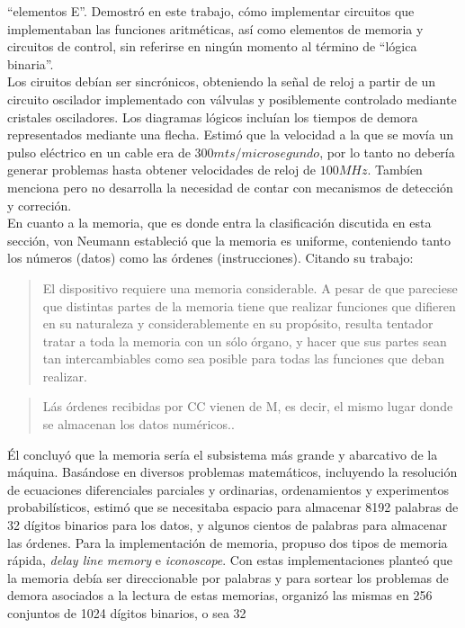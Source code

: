 ``elementos E''. Demostró en este trabajo, cómo implementar circuitos que
implementaban las funciones aritméticas, así como elementos de memoria y
circuitos de control, sin referirse en ningún momento al término de ``lógica
binaria''.\\
Los ciruitos debían ser sincrónicos, obteniendo la señal de reloj a partir de un
circuito oscilador implementado con válvulas y posiblemente controlado mediante
cristales osciladores. Los diagramas lógicos incluían los tiempos de demora
representados mediante una flecha. Estimó que la velocidad a la que se movía un
pulso eléctrico en un cable era de $300 mts/microsegundo$, por lo tanto no
debería generar problemas hasta obtener velocidades de reloj de $100MHz$.
Tambíen menciona pero no desarrolla la necesidad de contar con mecanismos de
detección y correción.\\
En cuanto a la memoria, que es donde entra la clasificación discutida en esta
sección, von Neumann estableció que la memoria es uniforme, conteniendo tanto
los números (datos) como las órdenes (instrucciones). Citando su trabajo:
\begin{quote}
  El dispositivo requiere una memoria considerable. A pesar de que pareciese 
  que distintas partes de la memoria tiene que realizar funciones que difieren 
  en su naturaleza y considerablemente en su propósito, resulta tentador tratar 
  a toda la memoria con un sólo órgano, y hacer que sus partes sean tan 
  intercambiables como sea posible para todas las funciones que deban realizar. 
  \cite[sección, 2.5]{vonNeumann}
\end{quote}
\begin{quote}
  Lás órdenes recibidas por CC vienen de M, es decir, el mismo lugar donde se
  almacenan los datos numéricos.\cite[sección, 14.0]{vonNeumann}.
\end{quote}
Él concluyó que la memoria sería el subsistema más grande y abarcativo de la
máquina. Basándose en diversos problemas matemáticos, incluyendo la resolución
de ecuaciones diferenciales parciales y ordinarias, ordenamientos y experimentos
probabilísticos, estimó que se necesitaba espacio para almacenar 8192 palabras
de 32 dígitos binarios para los datos, y algunos cientos de palabras para
almacenar las órdenes. Para la implementación de memoria, propuso dos tipos de
memoria rápida, \emph{delay line memory} e \emph{iconoscope}. Con estas
implementaciones planteó que la memoria debía ser direccionable por palabras y
para sortear los problemas de demora asociados a la lectura de estas memorias,
organizó las mismas en 256 conjuntos de 1024 dígitos binarios, o sea 32
